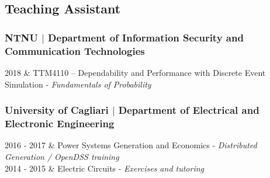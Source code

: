 \documentclass[11pt]{article}
\begin{document}

\subsection*{Teaching Assistant}
\subsubsection*{NTNU $\mid$ Department of Information Security and Communication Technologies}
\begin{tabularx}{\linewidth}{\twocols}
  2018 & TTM4110 – Dependability and Performance with Discrete Event Simulation - \textit{Fundamentals of Probability}\\
\end{tabularx}
\subsubsection*{University of Cagliari $\mid$ Department of Electrical and Electronic Engineering}
\begin{tabularx}{\linewidth}{\twocols}
2016 - 2017 & Power Systems Generation and Economics - \textit{Distributed Generation / OpenDSS training}\\
2014 - 2015 & Electric Circuits - \textit{Exercises and tutoring} \\
\end{tabularx}
\end{document}
